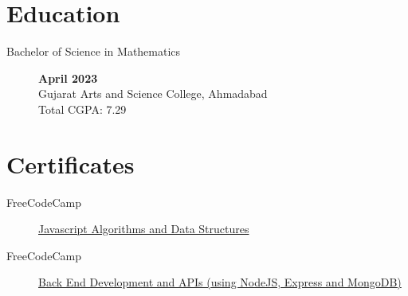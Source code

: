 \documentclass[a4paper,10pt]{article}
\begin{document}
\section{Education}

\begin{description}
    \item[Bachelor of Science in Mathematics ] \hfill  \textbf{April 2023} \\
        Gujarat Arts and Science College, Ahmadabad
        \\ Total CGPA\@: 7.29
\end{description}


\section{Certificates}
\begin{description}
    \item[FreeCodeCamp]
        \href{https://www.freecodecamp.org/certification/jaydamani/javascript-algorithms-and-data-structures}{
            Javascript Algorithms and Data Structures
        }
    \item[FreeCodeCamp]
        \href{https://www.freecodecamp.org/certification/jaydamani/back-end-development-and-apis}{
            Back End Development and APIs (using NodeJS, Express and MongoDB)
        }
\end{description}
\end{document}
